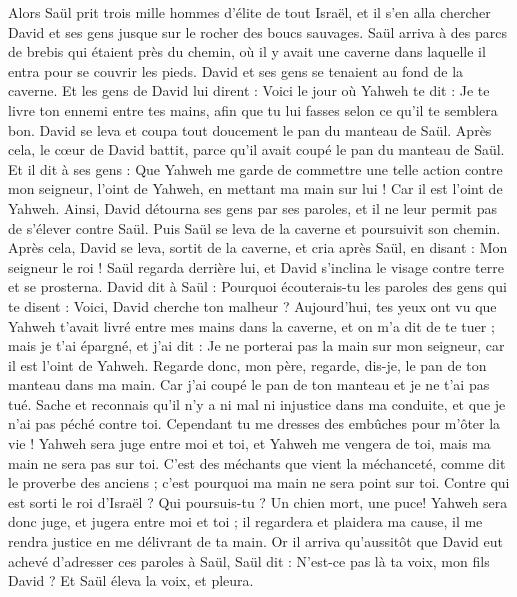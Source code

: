 \begin{multicols}{2}
Alors Saül prit trois mille hommes d'élite de tout Israël, et il s'en alla chercher David et ses gens jusque sur le rocher des boucs sauvages.
Saül arriva à des parcs de brebis qui étaient près du chemin, où il y avait une caverne dans laquelle il entra pour se couvrir les pieds. David et ses gens se tenaient au fond de la caverne.
Et les gens de David lui dirent : Voici le jour où Yahweh te dit : Je te livre ton ennemi entre tes mains, afin que tu lui fasses selon ce qu'il te semblera bon. David se leva et coupa tout doucement le pan du manteau de Saül.
Après cela, le cœur de David battit, parce qu'il avait coupé le pan du manteau de Saül.
Et il dit à ses gens : Que Yahweh me garde de commettre une telle action contre mon seigneur, l'oint de Yahweh, en mettant ma main sur lui ! Car il est l'oint de Yahweh.
Ainsi, David détourna ses gens par ses paroles, et il ne leur permit pas de s'élever contre Saül. Puis Saül se leva de la caverne et poursuivit son chemin.
Après cela, David se leva, sortit de la caverne, et cria après Saül, en disant : Mon seigneur le roi ! Saül regarda derrière lui, et David s'inclina le visage contre terre et se prosterna.
David dit à Saül : Pourquoi écouterais-tu les paroles des gens qui te disent : Voici, David cherche ton malheur ?
Aujourd'hui, tes yeux ont vu que Yahweh t'avait livré entre mes mains dans la caverne, et on m'a dit de te tuer ; mais je t'ai épargné, et j'ai dit : Je ne porterai pas la main sur mon seigneur, car il est l'oint de Yahweh.
Regarde donc, mon père, regarde, dis-je, le pan de ton manteau dans ma main. Car j'ai coupé le pan de ton manteau et je ne t'ai pas tué. Sache et reconnais qu'il n'y a ni mal ni injustice dans ma conduite, et que je n'ai pas péché contre toi. Cependant tu me dresses des embûches pour m'ôter la vie !
Yahweh sera juge entre moi et toi, et Yahweh me vengera de toi, mais ma main ne sera pas sur toi.
C'est des méchants que vient la méchanceté, comme dit le proverbe des anciens ; c'est pourquoi ma main ne sera point sur toi.
Contre qui est sorti le roi d'Israël ? Qui poursuis-tu ? Un chien mort, une puce!
Yahweh sera donc juge, et jugera entre moi et toi ; il regardera et plaidera ma cause, il me rendra justice en me délivrant de ta main.
Or il arriva qu'aussitôt que David eut achevé d'adresser ces paroles à Saül, Saül dit : N'est-ce pas là ta voix, mon fils David ? Et Saül éleva la voix, et pleura.

\end{multicols}
